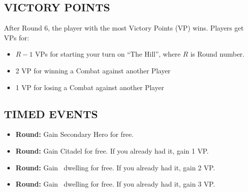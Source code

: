 \begin{multicols}{2}
\subsection*{\MakeUppercase{Victory Points}}
After Round 6, the player with the most Victory Points (VP) wins.
Players get VPs for:
\begin{itemize}
  \item $R-1$ VPs for starting your turn on ``The Hill'', where $R$ is Round number.
  \item 2 VP for winning a Combat against another Player
  \item 1 VP for losing a Combat against another Player
\end{itemize}

\subsection*{\MakeUppercase{Timed Events}}

\begin{itemize}
  \item \textbf{ Round:} Gain Secondary Hero for free.
  \item \textbf{ Round:} Gain Citadel for free. If you already had it, gain 1 VP.
  \item \textbf{ Round:} Gain \silver\ dwelling for free. If you already had it, gain 2 VP.
  \item \textbf{ Round:} Gain \golden\ dwelling for free. If you already had it, gain 3 VP.
\end{itemize}


\end{multicols}

